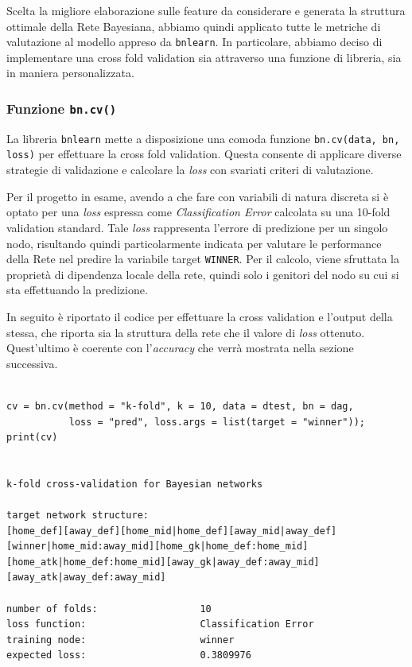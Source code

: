 \documentclass[hidelinks, 12pt]{article}
\begin{document}
Scelta la migliore elaborazione sulle feature da considerare e generata la struttura ottimale della Rete Bayesiana, abbiamo quindi applicato tutte le metriche di valutazione al modello appreso da \texttt{bnlearn}. In particolare, abbiamo deciso di implementare una cross fold validation sia attraverso una funzione di libreria, sia in maniera personalizzata.


\subsubsection{Funzione \texttt{bn.cv()}}

La libreria \texttt{bnlearn} mette a disposizione una comoda funzione \texttt{bn.cv(data, bn, loss)} per effettuare la cross fold validation. Questa consente di applicare diverse strategie di validazione e calcolare la \textit{loss} con svariati criteri di valutazione.

Per il progetto in esame, avendo a che fare con variabili di natura discreta si è optato per una \textit{loss} espressa come \textit{Classification Error} calcolata su una 10-fold validation standard. Tale \textit{loss} rappresenta l'errore di predizione per un singolo nodo, risultando quindi particolarmente indicata per valutare le performance della Rete nel predire la variabile target \texttt{WINNER}. Per il calcolo, viene sfruttata la proprietà di dipendenza locale della rete, quindi solo i genitori del nodo su cui si sta effettuando la predizione.

In seguito è riportato il codice per effettuare la cross validation e l'output della stessa, che riporta sia la struttura della rete che il valore di \textit{loss} ottenuto. Quest'ultimo è coerente con l'\textit{accuracy} che verrà mostrata nella sezione successiva.

\begin{verbatim}

cv = bn.cv(method = "k-fold", k = 10, data = dtest, bn = dag,
           loss = "pred", loss.args = list(target = "winner"));
print(cv)


k-fold cross-validation for Bayesian networks

target network structure:
[home_def][away_def][home_mid|home_def][away_mid|away_def]
[winner|home_mid:away_mid][home_gk|home_def:home_mid]
[home_atk|home_def:home_mid][away_gk|away_def:away_mid]
[away_atk|away_def:away_mid]

number of folds:                  10 
loss function:                    Classification Error 
training node:                    winner 
expected loss:                    0.3809976 
\end{verbatim}
\end{document}
